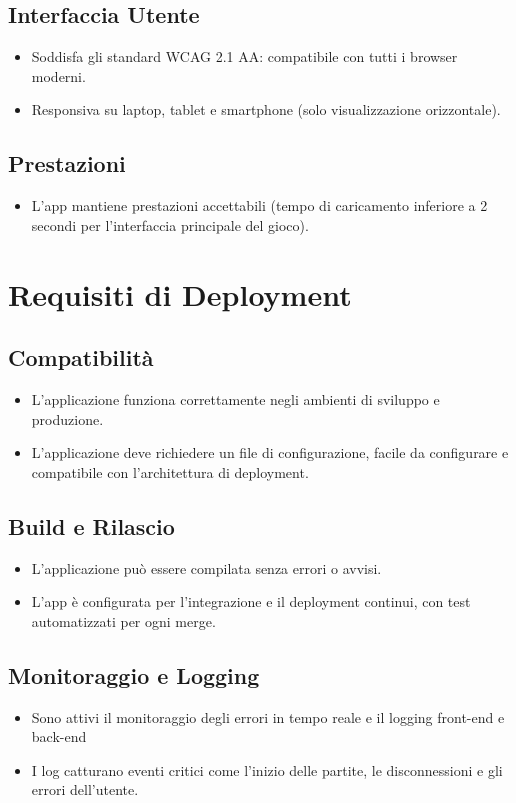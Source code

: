 \documentclass{article}
\begin{document}
\subsection{Interfaccia Utente}
\begin{itemize}
    \item Soddisfa gli standard WCAG 2.1 AA: compatibile con tutti i browser moderni.
    \item Responsiva su laptop, tablet e smartphone (solo visualizzazione orizzontale).
\end{itemize}

\subsection{Prestazioni}
\begin{itemize}
    \item L'app mantiene prestazioni accettabili (tempo di caricamento inferiore a 2 secondi per l'interfaccia principale del gioco).
\end{itemize}

\section{Requisiti di Deployment}

\subsection{Compatibilità}
\begin{itemize}
    \item L'applicazione funziona correttamente negli ambienti di sviluppo e produzione.
    \item L'applicazione deve richiedere un file di configurazione, facile da configurare e compatibile con l'architettura di deployment.
\end{itemize}

\subsection{Build e Rilascio}
\begin{itemize}
    \item L'applicazione può essere compilata senza errori o avvisi.
    \item L'app è configurata per l'integrazione e il deployment continui, con test automatizzati per ogni merge.
\end{itemize}

\subsection{Monitoraggio e Logging}
\begin{itemize}
    \item Sono attivi il monitoraggio degli errori in tempo reale e il logging front-end e back-end
    \item I log catturano eventi critici come l'inizio delle partite, le disconnessioni e gli errori dell'utente.
\end{itemize}
\end{document}
